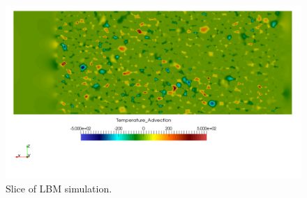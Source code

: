 \begin{figure}[t]
    \centering
    \includegraphics[width=\singleimagewidth]{chapters/figures/lbm/lbm-laminar-mixing}
    \caption{Slice of LBM simulation.}\label{fig:lbm-laminar-mixing}
\end{figure}

\FloatBarrier